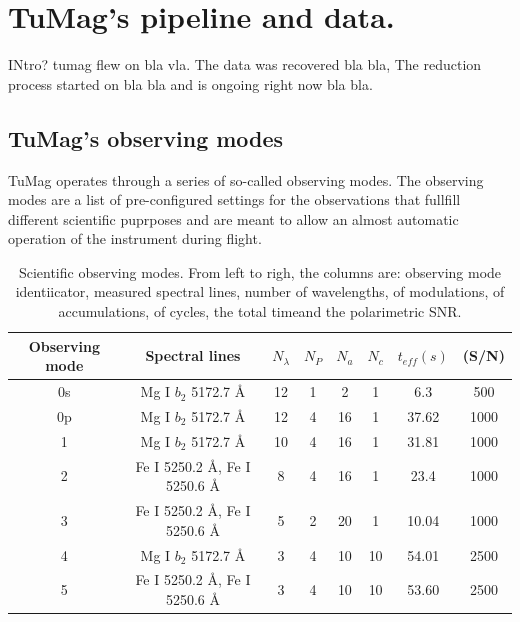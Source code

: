 \chapter{\label{CH:Pipeline}TuMag's pipeline and data.}
INtro? tumag flew on bla vla. The data was recovered bla bla,
The reduction process started on bla bla and is ongoing right now bla bla. 

\section{TuMag's observing modes}

TuMag operates through a series of so-called observing modes. The observing modes are a list of pre-configured settings for the observations that fullfill different scientific puprposes and are meant to allow an almost automatic operation of the instrument during flight. 

\begin{table}
    \centering
   \begin{tabular}{cccccccc}
    \hline
    \hline
    Observing mode & Spectral lines  & $N_\lambda$ & $N_P$ & $N_a$& $N_c$ & $t_{eff} (s)$ & (S/N) \\
    \hline
    0s & Mg I $b_2$ 5172.7 \r{A} & 12 & 1 & 2 & 1 & 6.3 & 500\\ 
    0p & Mg I $b_2$ 5172.7 \r{A} & 12 & 4 & 16 & 1 & 37.62 & 1000\\
    1  & Mg I $b_2$ 5172.7 \r{A} &  10 & 4 & 16 & 1 & 31.81 & 1000\\
    2  & Fe I 5250.2 \r{A}, Fe I 5250.6 \r{A} &  8 & 4 & 16 & 1 & 23.4 & 1000\\
    3  & Fe I 5250.2 \r{A}, Fe I 5250.6 \r{A} & 5 & 2 & 20 & 1 & 10.04 & 1000\\
    4  & Mg I $b_2$ 5172.7 \r{A} & 3 & 4 & 10 & 10 & 54.01 & 2500\\
    5  & Fe I 5250.2 \r{A}, Fe I 5250.6 \r{A} & 3 & 4 & 10 & 10 & 53.60 & 2500\\ 
    \hline
    \hline
    \end{tabular}
    \caption{Scientific observing modes. From left to righ, the columns are: observing mode identiicator, measured spectral lines, number of wavelengths, of modulations, of accumulations, of cycles, the total timeand the polarimetric SNR.}
    \label{table: scientific observing modes}
\end{table}

